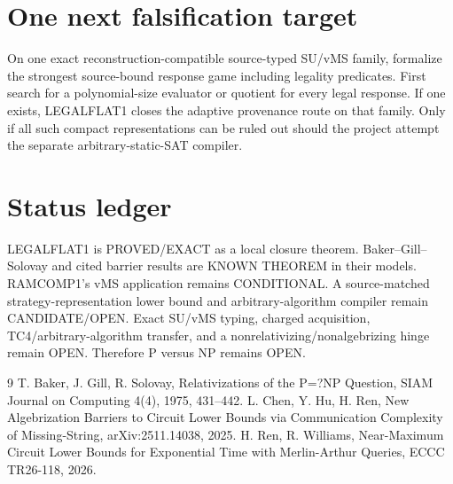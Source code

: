 \documentclass[11pt]{article}
\begin{document}
\section*{One next falsification target}
On one exact reconstruction-compatible source-typed SU/vMS family, formalize the strongest source-bound response game including legality predicates. First search for a polynomial-size evaluator or quotient for every legal response. If one exists, LEGALFLAT1 closes the adaptive provenance route on that family. Only if all such compact representations can be ruled out should the project attempt the separate arbitrary-static-SAT compiler.

\section*{Status ledger}
LEGALFLAT1 is PROVED/EXACT as a local closure theorem. Baker--Gill--Solovay and cited barrier results are KNOWN THEOREM in their models. RAMCOMP1's vMS application remains CONDITIONAL. A source-matched strategy-representation lower bound and arbitrary-algorithm compiler remain CANDIDATE/OPEN. Exact SU/vMS typing, charged acquisition, TC4/arbitrary-algorithm transfer, and a nonrelativizing/nonalgebrizing hinge remain OPEN. Therefore P versus NP remains OPEN.

\begin{thebibliography}{9}
 T. Baker, J. Gill, R. Solovay, Relativizations of the P=?NP Question, SIAM Journal on Computing 4(4), 1975, 431--442.
 L. Chen, Y. Hu, H. Ren, New Algebrization Barriers to Circuit Lower Bounds via Communication Complexity of Missing-String, arXiv:2511.14038, 2025.
 H. Ren, R. Williams, Near-Maximum Circuit Lower Bounds for Exponential Time with Merlin-Arthur Queries, ECCC TR26-118, 2026.
\end{thebibliography}
\end{document}
